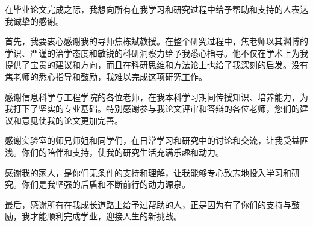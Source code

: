\documentclass[AutoFakeBold]{LZUThesis}
\begin{document}








\backmatter
\printbib




\Thanks

在毕业论文完成之际，我想向所有在我学习和研究过程中给予帮助和支持的人表达我诚挚的感谢。

首先，我要衷心感谢我的导师焦栋斌教授。在整个研究过程中，焦老师以其渊博的学识、严谨的治学态度和敏锐的科研洞察力给予我悉心指导。他不仅在学术上为我提供了宝贵的建议和方向，而且在科研思维和方法论上也给了我深刻的启发。没有焦老师的悉心指导和鼓励，我难以完成这项研究工作。

感谢信息科学与工程学院的各位老师，在我本科学习期间传授知识、培养能力，为我打下了坚实的专业基础。特别感谢参与我论文评审和答辩的各位老师，您们的建议和意见使我的论文更加完善。

感谢实验室的师兄师姐和同学们，在日常学习和研究中的讨论和交流，让我受益匪浅。你们的陪伴和支持，使我的研究生活充满乐趣和动力。

感谢我的家人，是你们无条件的支持和理解，让我能够专心致志地投入学习和研究。你们是我坚强的后盾和不断前行的动力源泉。

最后，感谢所有在我成长道路上给予过帮助的人，正是因为有了你们的支持与鼓励，我才能顺利完成学业，迎接人生的新挑战。

\Grade %
\end{document}
